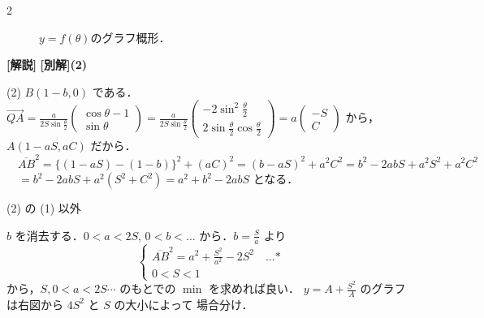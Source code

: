 \documentclass[../../../../main.tex]{subfiles}
\begin{document}
\begin{multicols}{2}
\begin{figure}[H]
        \caption{$y=f(\theta)$のグラフ概形．}
        \label{2005-1:fig:4}
    \end{figure}


    {\bf[解説]}
    \textbf{[別解](2)}

    (2)
    $B(1-b, 0)$ である．$\vec{QA} = \frac{a}{2S\sin\frac{\theta}{2}} \begin{pmatrix} \cos\theta - 1 \\ \sin\theta \end{pmatrix} = \frac{a}{2S\sin\frac{\theta}{2}} \begin{pmatrix} -2\sin^2\frac{\theta}{2} \\ 2\sin\frac{\theta}{2}\cos\frac{\theta}{2} \end{pmatrix} = a \begin{pmatrix} -S \\ C \end{pmatrix}$ から，
    $A(1-aS, aC)$ だから．
    $\quad \overline{AB}^2 = \{(1-aS)-(1-b)\}^2 + (aC)^2 = (b-aS)^2 + a^2C^2 = b^2 - 2abS + a^2S^2 + a^2C^2$
    $\quad = b^2 - 2abS + a^2(S^2+C^2) = a^2+b^2-2abS$
    となる．

    (2) の (1) 以外

    $b$ を消去する．$0 < a < 2S$, $0 < b < \dots$ から．$b=\frac{S}{a}$ より
    $$
        \begin{cases}
            \overline{AB}^2 = a^2 + \frac{S^2}{a^2} - 2S^2 \quad \text{...*} \\
            0 < S < 1
        \end{cases}
    $$
    から，$S, 0 < a < 2S \cdots$ のもとでの $\min$ を求めれば良い．
    $y = A + \frac{S^2}{A}$ のグラフは右図から $4S^2$ と $S$ の大小によって
    場合分け．


\end{multicols}
\end{document}
